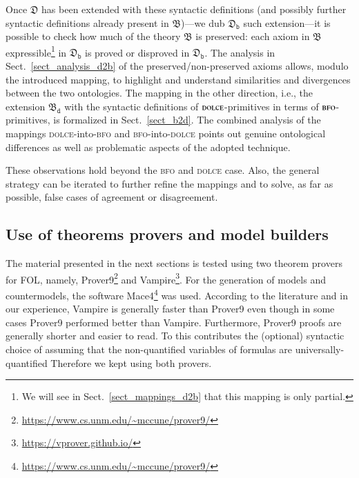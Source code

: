 \documentclass[ao]{iosart2x}
\newcommand{\nb}[1]{\textcolor{red}{$|$}\marginpar{\hspace*{-0cm}\parbox{20mm}{\scriptsize\raggedright\textcolor{red}{#1}}}}
\newcommand{\dolce}{{\textsc{dolce}}}
\newcommand{\bfo}{{\textsc{bfo}}}
\newcommand {\thdolce} {\ensuremath{\mathfrak{D}}}
\newcommand {\thbfo} {\ensuremath{\mathfrak{B}}}
\newcommand {\thbfobdmap} {\ensuremath{\mathfrak{B}_\texttt{d}}}
\newcommand {\thdolcedbmap} {\ensuremath{\mathfrak{D}_\texttt{b}}}
\begin{document}
Once {$\thdolce$} has been extended with these syntactic definitions (and possibly further syntactic definitions already present in {$\thbfo$})---we dub $\thdolcedbmap$ such extension---it is possible to check how much of the theory $\thbfo$ is preserved: each axiom in $\thbfo$ expressible\footnote{We will see in Sect.~\ref{sect_mappings_d2b} that this mapping is only partial.} in $\thdolcedbmap$ is proved or disproved in $\thdolcedbmap$. The analysis in Sect.~\ref{sect_analysis_d2b} of the preserved/non-preserved axioms allows, modulo the introduced mapping, to highlight and understand similarities and divergences between the two ontologies. The mapping in the other direction, i.e., the extension $\thbfobdmap$ with the syntactic definitions of {$\dolce$}-primitives in terms of {$\bfo$}-primitives, is formalized in Sect.~\ref{sect_b2d}. The combined analysis of the mappings {\dolce}-into-{\bfo} and {\bfo}-into-{\dolce} points out genuine ontological differences as well as problematic aspects of the adopted technique. 

These observations hold beyond the {\bfo} and {\dolce} case. Also, the general strategy can be iterated to further refine the mappings and to solve, as far as possible, false cases of agreement or disagreement.

\subsection{Use of theorems provers and model builders}

The material presented in the next sections is tested using two theorem provers for FOL, namely, Prover9\footnote{\url{https://www.cs.unm.edu/~mccune/prover9/}} and Vampire\footnote{\url{https://vprover.github.io/}}. For the generation of models and countermodels, the software Mace4\footnote{\url{https://www.cs.unm.edu/~mccune/prover9/}} was used.
According to the literature \citep{Sut16} and in our experience, Vampire is generally faster than Prover9 even though in some cases Prover9 performed better than Vampire. %
Furthermore, Prover9 proofs are generally shorter and easier to read. To this contributes the (optional) syntactic choice of assuming that the non-quantified variables of formulas are universally-quantified %
Therefore we kept using both provers. 
\end{document}
